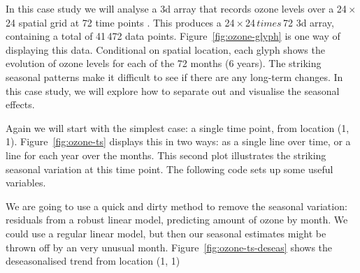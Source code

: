 \documentclass{scrartcl}
\newcommand{\x}{\,$\times$\,}
\begin{document}
In this case study we will analyse a 3d array that records ozone levels over a 24\x24 spatial grid at 72 time points \citep{hobbs:2007}.  This produces a 24\x24\,$times$\,72 3d array, containing a total of 41\,472 data points.  Figure~\ref{fig:ozone-glyph} is one way of displaying this data.  Conditional on spatial location, each glyph shows the evolution of ozone levels for each of the 72 months (6 years).  The striking seasonal patterns make it difficult to see if there are any long-term changes.  In this case study, we will explore how to separate out and visualise the seasonal effects.

%


Again we will start with the simplest case: a single time point, from location (1, 1).  Figure~\ref{fig:ozone-ts} displays this in two ways: as a single line over time, or a line for each year over the months.  This second plot illustrates the striking seasonal variation at this time point.  The following code sets up some useful variables.

% 


% 


We are going to use a quick and dirty method to remove the seasonal variation: residuals from a robust linear model, predicting amount of ozone by month.  We could use a regular linear model, but then our seasonal estimates might be thrown off by an very unusual month.  Figure~\ref{fig:ozone-ts-deseas} shows the deseasonalised trend from location (1, 1)
\end{document}
